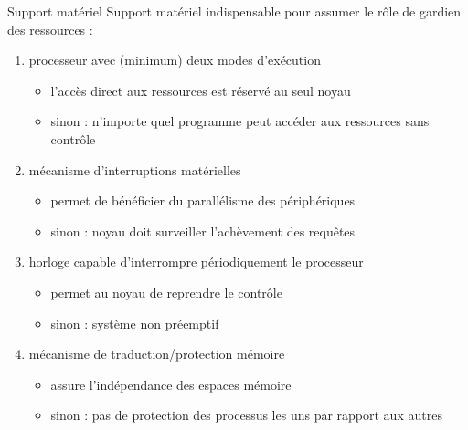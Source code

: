 \begin {frame} {Support matériel}
    Support matériel indispensable pour assumer le rôle de gardien
    des ressources :

    \begin {enumerate}
	\item processeur avec (minimum) deux modes d'exécution

	    \begin {itemize}
		\item l'accès direct aux ressources est réservé au seul
		    noyau
		\item sinon : n'importe quel programme peut accéder
		    aux ressources sans contrôle
	    \end {itemize}

	\item mécanisme d'interruptions matérielles

	    \begin {itemize}
		\item permet de bénéficier du parallélisme des
		    périphériques
		\item sinon : noyau doit surveiller l'achèvement
		    des requêtes

	    \end {itemize}

	\item horloge capable d'interrompre périodiquement le processeur

	    \begin {itemize}
		\item permet au noyau de reprendre le contrôle
		\item sinon : système non préemptif
	    \end {itemize}

	\item mécanisme de traduction/protection mémoire

	    \begin {itemize}
		\item assure l'indépendance des espaces mémoire
		\item sinon : pas de protection des processus les uns par
		    rapport aux autres
	    \end {itemize}

    \end {enumerate}

\end {frame}

